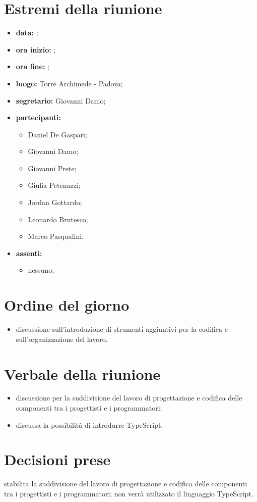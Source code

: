 \documentclass[a4paper,11pt]{article}
\begin{document}
	\section{Estremi della riunione}
	\begin{itemize}
		\item \textbf{data:} ;
		\item \textbf{ora inizio:} ;
		\item \textbf{ora fine:} ;
		\item \textbf{luogo:} Torre Archimede - Padova;
		\item \textbf{segretario:} Giovanni Damo;
		\item \textbf{partecipanti:}
			\begin{itemize}
				\item Daniel De Gaspari;
				\item Giovanni Damo;
				\item Giovanni Prete;
				\item Giulia Petenazzi;
				\item Jordan Gottardo;
				\item Leonardo Brutesco;
				\item Marco Pasqualini.
			\end{itemize}
		\item \textbf{assenti:}
			\begin{itemize}
 				\item nessuno;
			\end{itemize}
	\end{itemize}
	\section{Ordine del giorno}
		\begin{itemize}	
			\item discussione sull'introduzione di strumenti aggiuntivi per la codifica e sull'organizzazione del lavoro.
		\end{itemize}
	\section{Verbale della riunione}
		\begin{itemize}
			\item discussione per la suddivisione del lavoro di progettazione e codifica delle componenti tra i progettisti e i programmatori;
            \item discussa la possibilità di introdurre TypeScript.
		\end{itemize}
	\section{Decisioni prese}
		\begin{itemize}
	        \itemVI stabilita la suddivisione del lavoro di progettazione e codifica delle componenti tra i progettisti e i programmatori;
	        \itemVI non verrà utilizzato il linguaggio TypeScript.
		\end{itemize}
\end{document}
